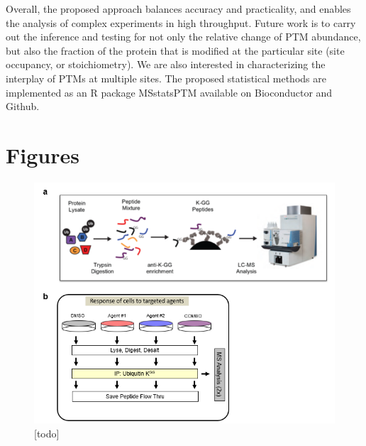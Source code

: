 \documentclass[mcp]{article}
\numberwithin{figure}{section} %
\numberwithin{table}{section}
\def\todo#1{{\color{red}[#1]}}
\begin{document}
Overall, the proposed approach balances accuracy and practicality, and enables the analysis of complex experiments in high throughput. Future work is to carry out the inference and testing for not only the relative change of PTM abundance, but also the fraction of the protein that is modified at the particular site (site occupancy, or stoichiometry). We are also interested in characterizing the interplay of PTMs at multiple sites. The proposed statistical methods are implemented as an R package MSstatsPTM available on Bioconductor and Github.

\newpage
\printbibliography


\newpage
\section{Figures}

\begin{figure}[ht]
\centering
\includegraphics[scale=.8]{images/fig1.png}
\caption{\todo{todo}}
\label{fig:workflow}
\end{figure}
\end{document}
